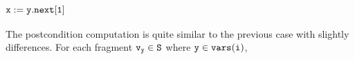 	
\subsubsection{${\tt x := y.next[1]}$}
The postcondition computation is quite similar to the previous case with slightly differences. For each fragment $\tt \mathtt{v}_y \in S$ where $\tt y \in {\tt vars}(\tt i)$,
%
%
%
%
%
%
%
